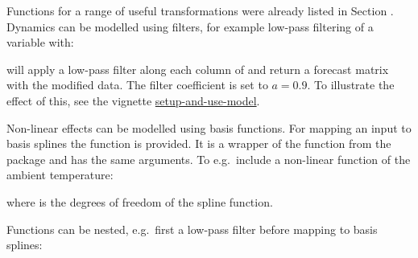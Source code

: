 Functions for a range of useful transformations were already listed in Section
. Dynamics can be modelled using filters, for example low-pass filtering of a variable with:
\begin{knitrout}
\color{fgcolor}\begin{kframe}
\begin{alltt}
\hlopt{\$}\hlstd{(} \hlstd{=} \hlstd{)}
\end{alltt}
\end{kframe}
\end{knitrout}
\noindent will apply a low-pass filter along each column
of  and return a forecast matrix with the modified data. The filter coefficient is set to $a=0.9$.
To illustrate the effect of this, see the vignette
\href{https://onlineforecasting.org/vignettes/setup-and-use-model.html#input-transformations}{setup-and-use-model}.

\noindent Non-linear effects can be modelled using basis functions. For mapping an input to basis splines the function  is
provided. It is a wrapper of the  function from the  package and has the same arguments. To e.g.\ include a non-linear function of the ambient temperature:
\begin{knitrout}
\color{fgcolor}\begin{kframe}
\begin{alltt}
\hlopt{\$}\hlstd{(} \hlstd{=} \hlstd{)}
\end{alltt}
\end{kframe}
\end{knitrout}
\noindent where  is the degrees of freedom of the spline function.

\noindent Functions can be nested, e.g.\ first a low-pass filter before mapping
to basis splines:
\begin{knitrout}
\color{fgcolor}\begin{kframe}
\begin{alltt}
\hlopt{\$}\hlstd{(} \hlstd{=} \hlstd{)}
\end{alltt}
\end{kframe}
\end{knitrout}

